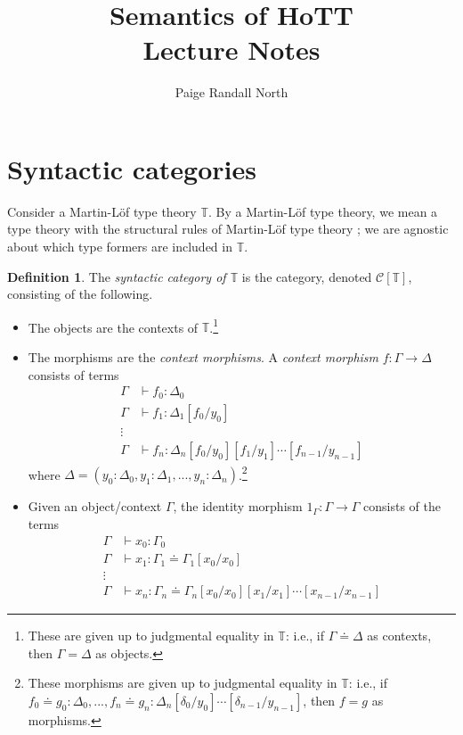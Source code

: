 \documentclass{article}
\title{Semantics of HoTT \\ Lecture Notes}
\author{Paige Randall North}
\theoremstyle{definition}
\newtheorem{definition}{Definition}[section]
\newcommand{\T}{\mathbb T}
\newcommand{\C}{\mathcal C}
\newcommand{\syncat}[1]{\C [#1]}
\newcommand{\seq}{\doteq}
\begin{document}
\maketitle

\section{Syntactic categories}

Consider a Martin-Löf type theory $\T$. By a Martin-Löf type theory, we mean a type theory with the structural rules of Martin-Löf type theory \cite{hofmann}; we are agnostic about which type formers are included in $\T$.

\begin{definition}
    The \emph{syntactic category of $\T$} is the category, denoted $\syncat{\T}$, consisting of the following.
    \begin{itemize}
        \item The objects are the contexts of $\T$.\footnote{These are given up to judgmental equality in $\T$: i.e., if $\Gamma \seq \Delta$ as contexts, then $\Gamma = \Delta$ as objects.}
        \item The morphisms are the \emph{context morphisms}. A \emph{context morphism} $f : \Gamma \to \Delta$ consists of terms
        \begin{align*}
            \Gamma &\vdash f_0 : \Delta_0 \\
            \Gamma &\vdash f_1 : \Delta_1[f_0 / y_0] \\
            \vdots \\
            \Gamma &\vdash f_n : \Delta_n [f_0 / y_0] [f_1 / y_1] \cdots [f_{n-1} / y_{n-1}]
        \end{align*}
        where $\Delta = (y_0 : \Delta_0 , y_1 : \Delta_1, ... , y_n : \Delta_n)$.\footnote{These morphisms are given up to judgmental equality in $\T$: i.e., if $f_0 \seq g_0 : \Delta_0, ..., f_n \seq g_n : \Delta_n [\delta_0 / y_0] \cdots [\delta_{n-1} / y_{n-1}]$, then $f = g$ as morphisms.}
        \item Given an object/context $\Gamma$, the identity morphism $1_\Gamma : \Gamma \to \Gamma$ consists of the terms
        \begin{align*}
            \Gamma &\vdash x_0 : \Gamma_0 \\
            \Gamma &\vdash x_1 : \Gamma_1 \seq \Gamma_1[x_0 / x_0] \\
            \vdots \\
            \Gamma &\vdash x_n : \Gamma_n \seq \Gamma_n [x_0 / x_0] [x_1 / x_1] \cdots [x_{n-1} / x_{n-1}]

\end{align*}
\end{itemize}
\end{definition}
\end{document}
